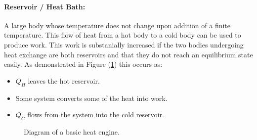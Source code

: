         \paragraph{Reservoir / Heat Bath:} A large body whose temperature does not change upon addition of a finite temperature.
\newpage
        This flow of heat from a hot body to a cold body can be used to produce work. This work is substanially increased if the two bodies undergoing heat exchange are both reservoirs and that they do not reach an equilibrium state easily. As demonstrated in Figure (\ref{fig:engine}) this occurs as:
        \begin{itemize}
            \item $Q_H$ leaves the hot reservoir.
            \item Some system converts some of the heat into work.
            \item $Q_C$ flows from the system into the cold reservoir.
        \end{itemize}
        \begin{figure}[H]
            \centering
            \caption{Diagram of a basic heat engine.}
            \label{fig:engine}
        \end{figure}
        
